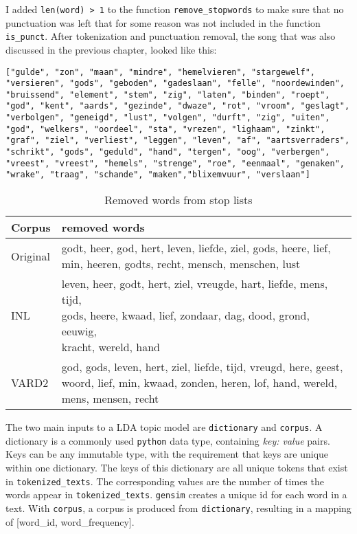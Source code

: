 \noindent I added \texttt{len(word) > 1} to the function \texttt{remove\_stopwords} to make sure that no punctuation was left that for some reason was not included in the function \texttt{is\_punct}. After tokenization and punctuation removal, the song that was also discussed in the previous chapter, looked like this:

\begin{lstlisting}
["gulde", "zon", "maan", "mindre", "hemelvieren", "stargewelf", "versieren", "gods", "geboden", "gadeslaan", "felle", "noordewinden", "bruissend", "element", "stem", "zig", "laten", "binden", "roept", "god", "kent", "aards", "gezinde", "dwaze", "rot", "vroom", "geslagt", "verbolgen", "geneigd", "lust", "volgen", "durft", "zig", "uiten", "god", "welkers", "oordeel", "sta", "vrezen", "lighaam", "zinkt", "graf", "ziel", "verliest", "leggen", "leven", "af", "aartsverraders", "schrikt", "gods", "geduld", "hand", "tergen", "oog", "verbergen", "vreest", "vreest", "hemels", "strenge", "roe", "eenmaal", "genaken", "wrake", "traag", "schande", "maken","blixemvuur", "verslaan"]
\end{lstlisting}

\begin{table}[]
	\centering
	\begin{tabular}{ll}
		\toprule
		Corpus & removed words \\
		\midrule
		Original & \makecell{godt, heer, god, hert, leven, liefde, ziel, gods, heere, lief,\\min, heeren, godts, recht, mensch, menschen, lust}                                  \\
		INL      & \makecell{leven, heer, godt, hert, ziel, vreugde, hart, liefde, mens, tijd,\\gods, heere, kwaad, lief, zondaar, dag, dood, grond, eeuwig,\\kracht, wereld, hand} \\
		VARD2    & \makecell{god, gods, leven, hert, ziel, liefde, tijd, vreugd, here, geest,\\woord, lief, min, kwaad, zonden, heren, lof, hand, wereld,\\mens, mensen, recht} \\
		\bottomrule
	\end{tabular}
	\caption{Removed words from stop lists}
	\label{table:RemovedWords}
\end{table}

\noindent The two main inputs to a LDA topic model are \texttt{dictionary} and \texttt{corpus}. A dictionary is a commonly used \texttt{python} data type, containing \textit{key: value} pairs. Keys can be any immutable type, with the requirement that keys are unique within one dictionary. The keys of this dictionary are all unique tokens that exist in \texttt{tokenized\_texts}. The corresponding values are the number of times the words appear in \texttt{tokenized\_texts}. \texttt{gensim} creates a unique id for each word in a text. With \texttt{corpus}, a corpus is produced from \texttt{dictionary}, resulting in a mapping of [word\_id, word\_frequency].

